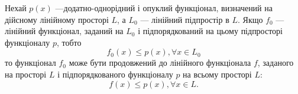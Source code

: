 \begin{theorem}
Нехай $p(x)$ ---додатно-однорідний
і опуклий функціонал, визначений на дійсному лінійному
просторі $L$, а $L_0$ --- лінійний підпростір в $L$. Якщо $f_0$ ---
лінійний функціонал, заданий на $L_0$ і підпорядкований на
цьому підпросторі функціоналу $p$, тобто
\begin{equation}
    \label{eq:9.1}
    f_0(x) \le p(x), \forall x \in L_0
\end{equation}
то функціонал $f_0$ може бути продовжений до лінійного
функціонала $f$, заданого на просторі $L$ і підпорядкованого
функціоналу $p$ на всьому просторі $L$:
\begin{equation}
    \label{eq:9.2}
    f(x) \le p(x), \forall x \in L.
\end{equation}
\end{theorem}

